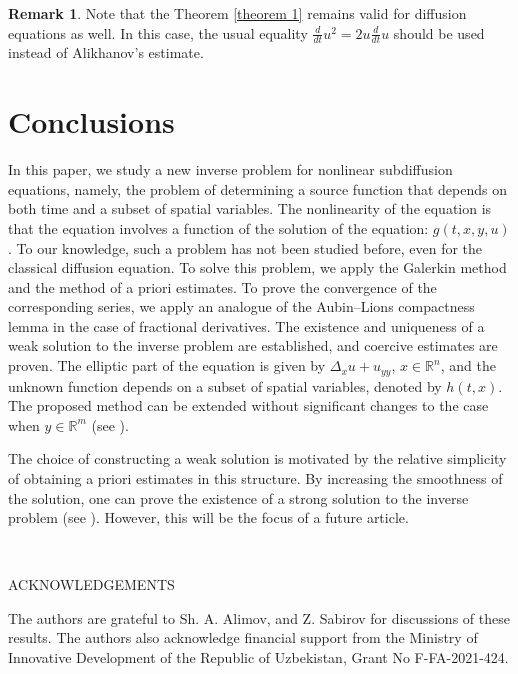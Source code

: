 \documentclass[12pt]{amsart}
\theoremstyle{definition}
\newtheorem{rem}[thm]{Remark}
\numberwithin{equation}{section}
\begin{document}
\begin{rem}\label{zam.3} Note that the Theorem \ref{theorem 1} remains valid for diffusion equations as well. In this case, the usual equality $\frac{d}{dt} u^2= 2 u \frac{d}{dt} u$ should be used instead of Alikhanov's estimate.
\end{rem}

\section{Conclusions}
 
In this paper, we study a new inverse problem for nonlinear subdiffusion equations, namely, the problem of determining a source function that depends on both time and a subset of spatial variables. The nonlinearity of the equation is that the equation involves a function of the solution of the equation: $g(t,x,y, u)$. To our knowledge, such a problem has not been studied before, even for the classical diffusion equation. To solve this problem, we apply the Galerkin method and the method of a priori estimates. To prove the convergence of the corresponding series, we apply an analogue of the Aubin–Lions compactness lemma in the case of fractional derivatives. The existence and uniqueness of a weak solution to the inverse problem are established, and coercive estimates are proven.
The elliptic part of the equation is given by $\Delta_x u + u_{yy}$, $x\in \mathbb{R}^n$, and the unknown function depends on a subset of spatial variables, denoted by $h(t, x)$. The proposed method can be extended without significant changes to the case when $y \in \mathbb{R}^m$ (see \cite{AshurovMuhiddinovanew1}).

The choice of constructing a weak solution is motivated by the relative simplicity of obtaining a priori estimates in this structure. By increasing the smoothness of the solution, one can prove the existence of a strong solution to the inverse problem (see \cite{Hompush}). However, this will be the focus of a future article.

\



\begin{center}
ACKNOWLEDGEMENTS    
\end{center}

The authors are grateful to Sh. A. Alimov, and Z. Sabirov for discussions of
these results. The authors also acknowledge financial support from the Ministry of Innovative Development of the Republic of Uzbekistan, Grant No F-FA-2021-424.
\end{document}

